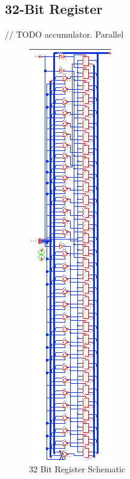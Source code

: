 \documentclass[11pt]{article}
\begin{document}
	\subsection{32-Bit Register}
		
		// TODO accumulator. Parallel
	
		\begin{figure}[H] 
			\centering 
			\includegraphics[width=\textwidth,height=\dimexpr\textheight-4\baselineskip-\abovecaptionskip-\belowcaptionskip\relax,keepaspectratio]{"Pictures/nBitRegister 32-Bit Schematic"}
			\caption{32 Bit Register Schematic} 
			\label{fig:nBitRegister-32-Bit-Schematic} 
		\end{figure}
	
\end{document}
